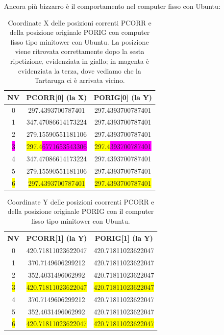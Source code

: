 Ancora più bizzarro è il comportamento nel computer fisso con Ubuntu:

\begin{table}[H]

\begin{center}
\begin{tabular}{| c | c | c |}
\hline
	NV & PCORR[0] (la X) & PORIG[0] (la Y) \\ \hline
0 & 297.4393700787401 & 297.4393700787401 \\ \hline
1 & 347.47086614173224 & 297.4393700787401 \\ \hline
2 & 279.15590551181106 & 297.4393700787401 \\ \hline
\colorbox{magenta}{3} & \colorbox{yellow}{297.4}\colorbox{magenta}{6771653543306} & \colorbox{yellow}{297.4}\colorbox{magenta}{393700787401} \\ \hline
4 & 347.47086614173224 & 297.4393700787401 \\ \hline
5 & 279.15590551181106 & 297.4393700787401 \\ \hline
\colorbox{yellow}{6} & \colorbox{yellow}{297.4393700787401} & \colorbox{yellow}{297.4393700787401} \\ \hline
\end{tabular}
\caption{Coordinate X delle posizioni correnti PCORR e della posizione originale PORIG con computer fisso tipo minitower con Ubuntu. La posizione viene ritrovata correttamente dopo la sesta ripetizione, evidenziata in giallo; in magenta è evidenziata la terza, dove vediamo che la Tartaruga ci è arrivata vicino.}
\end{center}
\end{table}

\begin{table}[H]

\begin{center}
\begin{tabular}{| c | c | c |}
\hline
	NV & PCORR[1] (la Y) & PORIG[1] (la Y) \\ \hline
0 & 420.71811023622047 & 420.71811023622047 \\ \hline
1 & 370.7149606299212 & 420.71811023622047 \\ \hline
2 & 352.4031496062992 & 420.71811023622047 \\ \hline
\colorbox{yellow}{3} & \colorbox{yellow}{420.71811023622047} & \colorbox{yellow}{420.71811023622047} \\ \hline
4 & 370.7149606299212 & 420.71811023622047 \\ \hline
5 & 352.4031496062992 & 420.71811023622047 \\ \hline
\colorbox{yellow}{6} & \colorbox{yellow}{420.71811023622047} & \colorbox{yellow}{420.71811023622047} \\ \hline
\end{tabular}
\caption{Coordinate Y delle posizioni coorrenti PCORR e della posizione originale PORIG con il computer fisso tipo minitower con Ubuntu.}
\end{center}
\end{table}

